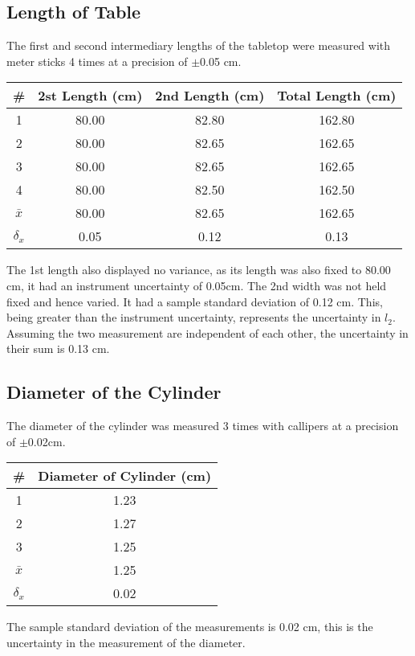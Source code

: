 \documentclass[11pt]{article}
\begin{document}
\subsection{Length of Table}
The first and second intermediary lengths of the tabletop were measured with meter sticks 4 times at a precision of \(\pm\)0.05 cm.
\begin{center}
	\begin{tabular}{|c|c|c|c|}
		\hline
		\# & 2st Length (cm) & 2nd Length (cm) & Total Length (cm)\\
		\hline
		1 & 80.00 & 82.80 & 162.80 \\
		2 & 80.00 & 82.65 & 162.65 \\
		3 & 80.00 & 82.65 & 162.65 \\
		4 & 80.00 & 82.50 & 162.50 \\
		\hline
		\(\bar{x}\) & 80.00 & 82.65 & 162.65 \\
		\hline
		\(\delta_x\) & 0.05 & 0.12 & 0.13 \\
		\hline
	\end{tabular}
\end{center}
	The 1st length also displayed no variance, as its length was also fixed to 80.00 cm, it had an instrument uncertainty of 0.05cm. The 2nd width was not held fixed and hence varied. It had a sample standard deviation of 0.12 cm. This, being greater than the instrument uncertainty, represents the uncertainty in \( l_2 \). Assuming the two measurement are independent of each other, the uncertainty in their sum is 0.13 cm.
\subsection{Diameter of the Cylinder}
The diameter of the cylinder was measured 3 times with callipers at a precision of \( \pm \)0.02cm.
\begin{center}
\begin{tabular}{|c|c|}
	\hline
	\# & Diameter of Cylinder (cm) \\
	\hline
	1 & 1.23 \\
	2 & 1.27 \\
	3 & 1.25 \\
	\hline
	\(\bar{x}\) & 1.25 \\
	\hline
	\( \delta_x \) & 0.02 \\
	\hline
\end{tabular}
\end{center}
The sample standard deviation of the measurements is 0.02 cm, this is the uncertainty in the measurement of the diameter.
\end{document}
